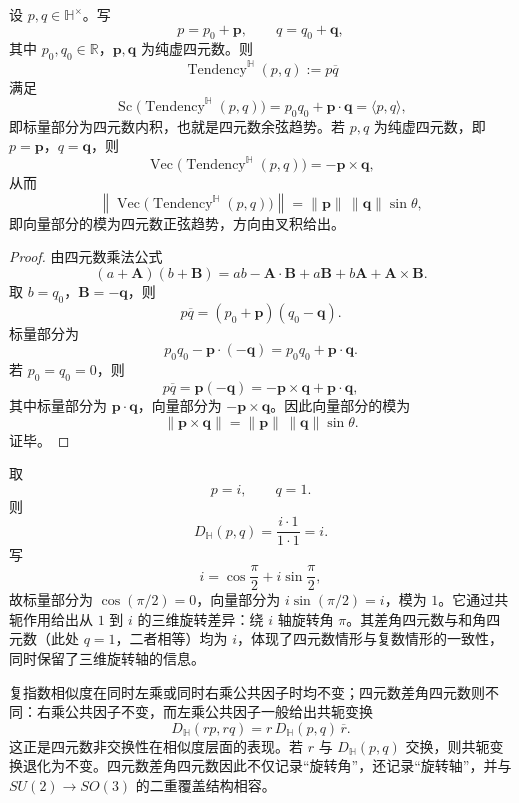 \begin{theorem}\label{thm:quaternion_exp_tendency_geometry}
设 $p,q\in\mathbb H^\times$。写
\[
p=p_0+\mathbf p,\qquad q=q_0+\mathbf q,
\]
其中 $p_0,q_0\in\mathbb R$，$\mathbf p,\mathbf q$ 为纯虚四元数。则
\[
\operatorname{Tendency}^{\mathbb H}(p,q):=p\overline q
\]
满足
\[
\operatorname{Sc}\bigl(\operatorname{Tendency}^{\mathbb H}(p,q)\bigr)
=
p_0q_0+\mathbf p\cdot\mathbf q
=
\langle p,q\rangle,
\]
即标量部分为四元数内积，也就是四元数余弦趋势。若 $p,q$ 为纯虚四元数，即 $p=\mathbf p$，$q=\mathbf q$，则
\[
\operatorname{Vec}\bigl(\operatorname{Tendency}^{\mathbb H}(p,q)\bigr)
=
-\mathbf p\times\mathbf q,
\]
从而
\[
\left\|\operatorname{Vec}\bigl(\operatorname{Tendency}^{\mathbb H}(p,q)\bigr)\right\|
=
\|\mathbf p\|\,\|\mathbf q\|\sin\theta,
\]
即向量部分的模为四元数正弦趋势，方向由叉积给出。
\end{theorem}

\begin{proof}
由四元数乘法公式
\[
(a+\mathbf A)(b+\mathbf B)
=
ab-\mathbf A\cdot\mathbf B
+
a\mathbf B+b\mathbf A+\mathbf A\times\mathbf B.
\]
取 $b=q_0$，$\mathbf B=-\mathbf q$，则
\[
p\overline q=(p_0+\mathbf p)(q_0-\mathbf q).
\]
标量部分为
\[
p_0q_0-\mathbf p\cdot(-\mathbf q)=p_0q_0+\mathbf p\cdot\mathbf q.
\]
若 $p_0=q_0=0$，则
\[
p\overline q=\mathbf p(-\mathbf q)=-\mathbf p\times\mathbf q+\mathbf p\cdot\mathbf q,
\]
其中标量部分为 $\mathbf p\cdot\mathbf q$，向量部分为 $-\mathbf p\times\mathbf q$。因此向量部分的模为
\[
\|\mathbf p\times\mathbf q\|=\|\mathbf p\|\,\|\mathbf q\|\sin\theta.
\]
证毕。
\end{proof}

\begin{example}[四元数指数相似度的数值示例]\label{ex:quaternion_exp_similarity_example}
取
\[
p=i,\qquad q=1.
\]
则
\[
D_{\mathbb H}(p,q)=\frac{i\cdot 1}{1\cdot 1}=i.
\]
写
\[
i=\cos\frac{\pi}{2}+i\sin\frac{\pi}{2},
\]
故标量部分为 $\cos(\pi/2)=0$，向量部分为 $i\sin(\pi/2)=i$，模为 $1$。它通过共轭作用给出从 $1$ 到 $i$ 的三维旋转差异：绕 $i$ 轴旋转角 $\pi$。其差角四元数与和角四元数（此处 $q=1$，二者相等）均为 $i$，体现了四元数情形与复数情形的一致性，同时保留了三维旋转轴的信息。
\end{example}

\begin{remark}[四元数差角四元数的非交换性]\label{rem:quaternion_exp_similarity_noncommutative}
复指数相似度在同时左乘或同时右乘公共因子时均不变；四元数差角四元数则不同：右乘公共因子不变，而左乘公共因子一般给出共轭变换
\[
D_{\mathbb H}(rp,rq)=r\,D_{\mathbb H}(p,q)\,\overline r.
\]
这正是四元数非交换性在相似度层面的表现。若 $r$ 与 $D_{\mathbb H}(p,q)$ 交换，则共轭变换退化为不变。四元数差角四元数因此不仅记录“旋转角”，还记录“旋转轴”，并与 $SU(2)\to SO(3)$ 的二重覆盖结构相容。
\end{remark}

